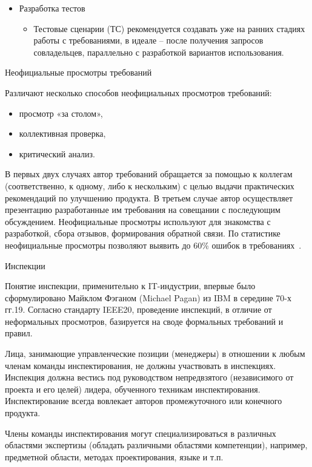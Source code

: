 \documentclass{../industrial-development}
\begin{document}
{\begin{frame}
\begin{itemize}
\item  \alert{Разработка тестов}
\begin{itemize}
\item Тестовые сценарии (ТС) рекомендуется создавать уже на ранних стадиях работы с требованиями, в идеале – после получения запросов совладельцев, параллельно с разработкой вариантов использования.
\end{itemize}
\end{itemize}
\end{frame}

\lecturenotes

\alert{Неофициальные просмотры требований}

Различают несколько способов неофициальных просмотров требований:
\begin{itemize}
\item просмотр «за столом»,
\item коллективная проверка,
\item критический анализ.
\end{itemize}

В первых двух случаях автор требований обращается за помощью к коллегам (соответственно, к одному, либо к нескольким) с целью выдачи практических
рекомендаций по улучшению продукта. В третьем случае автор осуществляет презентацию разработанные им требования на совещании с последующим обсуждением. Неофициальные просмотры используют для знакомства с разработкой, сбора
отзывов, формирования обратной связи. По статистике
неофициальные просмотры позволяют выявить до 60\% ошибок в требованиях~\cite[с.~66-67]{Maglinec}.

\alert{Инспекции}

Понятие инспекции, применительно к IT-индустрии, впервые было сформулировано Майклом Фэганом (Michael Pagan) из IBM в середине 70-х гг.19.
Согласно стандарту IEEE20, проведение инспекций, в отличие от неформальных просмотров, базируется на своде формальных требований и правил. 

Лица, занимающие управленческие позиции (менеджеры) в отношении к любым членам команды инспектирования, не должны участвовать в инспекциях.
Инспекция должна вестись под руководством непредвзятого (независимого от
проекта и его целей) лидера, обученного техникам инспектирования. Инспектирование всегда вовлекает авторов промежуточного или конечного
продукта.

Члены команды инспектирования могут специализироваться в различных
областями экспертизы (обладать различными областями компетенции), например,
предметной области, методах проектирования, языке и т.п. 

}
\end{document}
